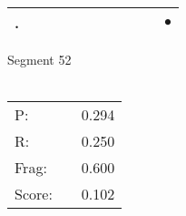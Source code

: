 \documentclass[landscape]{article}
\newcommand{\ssp}{\hspace{2pt}}
\newcommand{\mex}{\cellcolor{g}$\bullet$}
\begin{document}
\begin{tabular}{|l|p{10pt}|p{10pt}|p{10pt}|p{10pt}|p{10pt}|p{10pt}|p{10pt}|p{10pt}|p{10pt}|p{10pt}|}
\hline
\ssp \cellcolor{ref9}. \ssp&\hspace{2pt}&\hspace{2pt}&\hspace{2pt}&\hspace{2pt}&\hspace{2pt}&\hspace{2pt}&\hspace{2pt}&\hspace{2pt}&\hspace{2pt}&\hspace{2pt}\mex\\
\hline
\end{tabular}

\vspace{6pt}
\noindent Segment 52\\\\
\noindent\begin{tabular}{lm{12pt}r}
\hline
P:&&0.294\\
R:&&0.250\\
Frag:&&0.600\\
Score:&&0.102\\
\end{tabular}

\newpage
\end{document}
